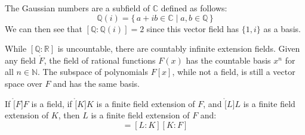 \documentclass{article}                                                        %
\begin{document}
        \begin{example}
            The Gaussian numbers are a subfield of $\mathbb{C}$ defined as
            follows:
            \begin{equation}
                \mathbb{Q}(i)=\{\,a+ib\in\mathbb{C}\;|\;a,b\in\mathbb{Q}\,\}
            \end{equation}
            We can then see that $[\mathbb{Q}:\mathbb{Q}(i)]=2$ since this
            vector field has $\{1,i\}$ as a basis.
        \end{example}
        \begin{example}
            While $[\mathbb{Q}:\mathbb{R}]$ is uncountable, there are countably
            infinite extension fields. Given any field $\ring{F}$, the field of
            rational functions $F(x)$ has the countable basis $x^{n}$ for all
            $n\in\mathbb{N}$. The subspace of polynomials $F[x]$, while not a
            field, is still a vector space over $F$ and has the same basis.
        \end{example}
        \begin{theorem}
            If $\ring[F]{F}$ is a field, if $\ring[K]{K}$ is a finite field
            extension of $F$, and $\ring[L]{L}$ is a finite field extension of
            $K$, then $L$ is a finite field extension of $F$ and:
            \begin{equation}
                [L:F]=[L:K][K:F]
            \end{equation}
        \end{theorem}
\end{document}

